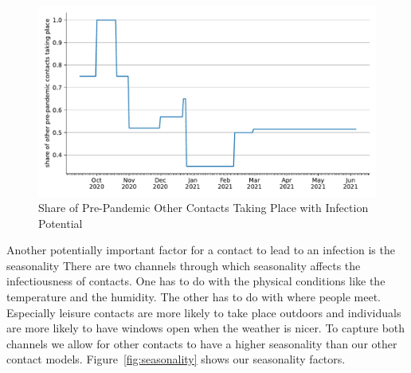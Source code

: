\begin{figure}
    \centering
    \includegraphics[width=\textwidth]{figures/results/figures/data/other_multiplier}
    \caption{Share of Pre-Pandemic Other Contacts Taking Place with Infection Potential}
    \label{fig:other_multiplier}
\end{figure}

Another potentially important factor for a contact to lead to an infection is the
seasonality \citep{Kuehn2020, Carlson2020} There are two channels through which
seasonality affects the infectiousness of contacts. One has to do with the physical
conditions like the temperature and the humidity. The other has to do with where people
meet. Especially leisure contacts are more likely to take place outdoors and individuals
are more likely to have windows open when the weather is nicer. To capture both channels
we allow for other contacts to have a higher seasonality than our other contact models.
Figure~\ref{fig:seasonality} shows our seasonality factors.

